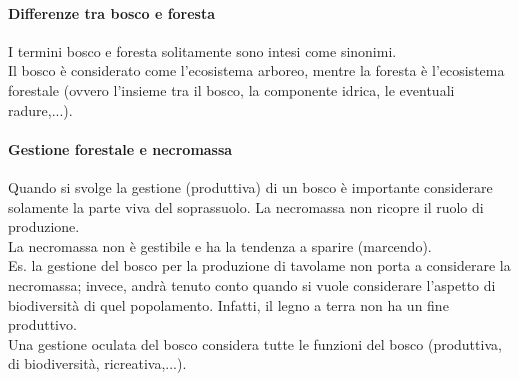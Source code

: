 \paragraph{Differenze tra bosco e foresta}
I termini bosco e foresta solitamente sono intesi come sinonimi.\\
Il bosco è considerato come l'ecosistema arboreo, mentre la foresta è l'ecosistema forestale (ovvero l'insieme tra il bosco, la componente idrica, le eventuali radure,...).
\paragraph{Gestione forestale e necromassa}
Quando si svolge la gestione (produttiva) di un bosco è importante considerare solamente la parte viva del soprassuolo. La necromassa non ricopre il ruolo di produzione.\\
La necromassa non è gestibile e ha la tendenza a sparire (marcendo).\\
Es. la gestione del bosco per la produzione di tavolame non porta a considerare la necromassa; invece, andrà tenuto conto quando si vuole considerare l'aspetto di biodiversità di quel popolamento. Infatti, il legno a terra non ha un fine produttivo.\\
Una gestione oculata del bosco considera tutte le funzioni del bosco (produttiva, di biodiversità, ricreativa,...).